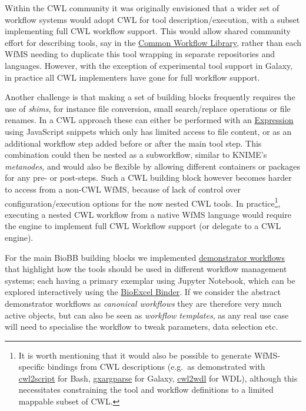 Within the CWL community it was originally envisioned that a wider set
of workflow systems would adopt CWL for tool description/execution, with
a subset implementing full CWL workflow support. This would allow shared
community effort for describing tools, say in the
\href{https://github.com/common-workflow-library/}{Common Workflow
Library}, rather than each WfMS needing to duplicate this tool wrapping
in separate repositories and languages. However, with the exception of
experimental tool support in Galaxy, in practice all CWL implementers
have gone for full workflow support.

Another challenge is that making a set of building blocks frequently
requires the use of \emph{shims}, for instance file conversion, small
search/replace operations or file renames. In a CWL approach these can
either be performed with an
\href{https://www.commonwl.org/v1.2/Workflow.html\#Expressions_(Optional)}{Expression}
using JavaScript snippets which only has limited access to file content,
or as an additional workflow step added before or after the main tool
step. This combination could then be nested as a subworkflow, similar to
KNIME's \emph{metanodes}, and would also be flexible by allowing
different containers or packages for any pre- or post-steps. Such a CWL
building block however becomes harder to access from a non-CWL WfMS,
because of lack of control over configuration/execution options for the
now nested CWL tools. In practice\footnote{It is worth mentioning that
  it would also be possible to generate WfMS-specific bindings from CWL
  descriptions (e.g.~as demonstrated with
  \href{https://github.com/common-workflow-lab/cwl2script}{cwl2script}
  for Bash,
  \href{https://github.com/common-workflow-lab/gxargparse}{gxargparse}
  for Galaxy,
  \href{https://github.com/common-workflow-lab/cwl2wdl}{cwl2wdl} for
  WDL), although this necessitates constraining the tool and workflow
  definitions to a limited mappable subset of CWL.}, executing a nested
CWL workflow from a native WfMS language would require the engine to
implement full CWL Workflow support (or delegate to a CWL engine).

For the main BioBB building blocks we implemented
\href{http://mmb.irbbarcelona.org/biobb/workflows}{demonstrator
workflows} that highlight how the tools should be used in different
workflow management systems; each having a primary exemplar using
Jupyter Notebook, which can be explored interactively using the
\href{https://hub-bioexcel-binder.tsi.ebi.ac.uk/h}{BioExcel Binder}. If
we consider the abstract demonstrator workflows as \emph{canonical
workflows} they are therefore very much active objects, but can also be
seen as \emph{workflow templates}, as any real use case will need to
specialise the workflow to tweak parameters, data selection etc.

